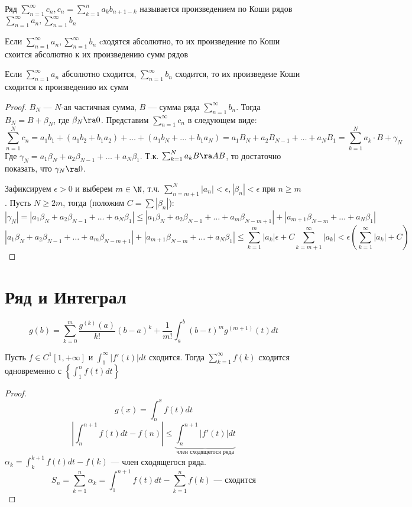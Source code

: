 \begin{definition}
    Ряд \(\sum_{n = 1}^\infty c_n, c_n = \sum_{k = 1}^na_kb_{n + 1 - k}\) называется произведением по Коши рядов \(\sum_{n = 1}^\infty a_n, \sum_{n = 1}^\infty b_n\)
\end{definition}

\begin{corollary}
    Если \(\sum_{n = 1}^\infty a_n, \sum_{n = 1}^\infty b_n\) cходятся абсолютно, то их произведение по Коши схоится абсолютно к их произведению сумм рядов
\end{corollary}

\begin{theorem}[Мертекс]
    Если \(\sum_{n = 1}^\infty a_n\) абсолютно сходится, \(\sum_{n = 1}^\infty b_n\) сходится, то их произведеие Коши сходится к произведению их сумм
\end{theorem}
\begin{proof}
    \(B_N\) --- \(N\)-ая частичная сумма, \(B\) --- сумма ряда \(\sum_{n = 1}^\infty b_n\). Тогда \(B_N = B + \beta_N\), где \(\beta_N \ra 0\). Представим \(\sum_{n = 1}^\infty c_n\) в следующем виде:
    \[\sum_{n = 1}^N c_n = a_1b_1 + (a_1b_2 + b_1a_2) + \dots + (a_1b_N + \dots + b_1a_N) = a_1B_N + a_2B_{N - 1} + \dots + a_NB_1 = \sum_{k = 1}^N a_k \cdot B + \gamma_N\]
    Где \(\gamma_N = a_1\beta_N + a_2\beta_{N - 1} + \dots + a_N\beta_1\). Т.к. \(\sum_{k = 1}^N a_kB \ra AB\), то достаточно показать, что \(\gamma_N \ra 0\). 

    Зафиксируем \(\epsilon > 0\) и выберем \(m \in \N\), т.ч. \(\sum_{n = m + 1}^N|a_n| < \epsilon, |\beta_n| < \epsilon\) при \(n \ge m\). Пусть \(N \ge 2m\), тогда (положим \(C = \sum |\beta_n|\)):
    \[|\gamma_N| = |a_1\beta_N + a_2\beta_{N - 1} + \dots + a_N\beta_1| \le |a_1\beta_N + a_2\beta_{N - 1} + \dots + a_m\beta_{N - m + 1}|  + |a_{m + 1}\beta_{N - m} + \dots + a_N\beta_1|\]
    \[|a_1\beta_N + a_2\beta_{N - 1} + \dots + a_m\beta_{N - m + 1}|  + |a_{m + 1}\beta_{N - m} + \dots + a_N\beta_1| \le \sum_{k = 1}^m |a_k|\epsilon + C \sum_{k = m + 1}^\infty |a_k| < \epsilon\left(\sum_{k = 1}^\infty|a_k| + C\right)\]
\end{proof}

\section{Ряд и Интеграл}
\[g(b) = \sum_{k = 0}^m \frac{g^{(k)}(a)}{k!}(b - a)^k + \frac{1}{m!}\int_a^b(b - t)^mg^{(m + 1)}(t)dt\]

Пусть \(f \in C^1[1, +\infty]\) и \(\int_1^\infty|f'(t)|dt\) сходится. Тогда \(\sum_{k = 1}^\infty f(k)\) сходится одновременно с \(\left\{\int_1^n f(t)dt\right\}\)

\begin{proof}
    \[g(x) = \int_n^xf(t)dt \]
    \[\left|\int_n^{n + 1}f(t)dt - f(n)\right| \le \underbrace{\int_n^{n + 1}|f'(t)|dt}_{\text{член сходящегося ряда}}\]
    \(\alpha_k = \int_k^{k + 1}f(t)dt - f(k)\) --- член сходящегося ряда.
    \[S_n = \sum_{k = 1}^n \alpha_k = \int_1^{n + 1}f(t)dt - \sum_{k = 1}^nf(k) \text{ --- сходится}\]
\end{proof}